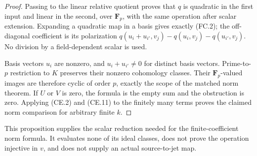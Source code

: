 \begin{proof}
Passing to the linear relative quotient proves
that \(q\) is quadratic in the first input and
linear in the second, over \(\mathbf F_p\),
with the same operation after scalar extension.
Expanding a quadratic map in a basis gives
exactly (FC.2); the off-diagonal coefficient
is its polarization
\(q(u_i+u_{i'},v_j)-q(u_i,v_j)-q(u_{i'},v_j)\).
No division by a field-dependent scalar is used.

Basis vectors \(u_i\) are nonzero, and
\(u_i+u_{i'}\ne0\) for distinct basis vectors.
Prime-to-\(p\) restriction to \(K\) preserves
their nonzero cohomology classes.  Their
\(\mathbf F_p\)-valued images are therefore
cyclic of order \(p\), exactly the scope of
the matched norm theorem.  If \(U\) or \(V\)
is zero, the formula is the empty sum and
the obstruction is zero.  Applying (CE.2)
and (CE.11) to the finitely many terms proves
the claimed norm comparison for arbitrary
finite \(k\).
\end{proof}

This proposition supplies the scalar reduction
needed for the finite-coefficient norm formula.
It evaluates none of its ideal classes, does
not prove the operation injective in \(v\),
and does not supply an actual source-to-jet map.
